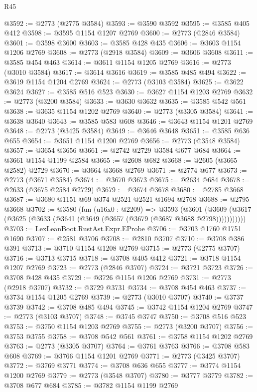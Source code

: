 \begin{lexlean}{R45}
\begin{coremodule}
@3592 := @2773 (@2775 @3584)
@3593 := @3590 @3592
@3595 := @3585 @405 @412
@3598 := @3595 @1154 @1207 @2769
@3600 := @2773 (@2846 @3584)
@3601 := @3598 @3600
@3603 := @3585 @428 @435
@3606 := @3603 @1154 @1206 @2769
@3608 := @2773 (@2918 @3584)
@3609 := @3606 @3608
@3611 := @3585 @454 @463
@3614 := @3611 @1154 @1205 @2769
@3616 := @2773 (@3010 @3584)
@3617 := @3614 @3616
@3619 := @3585 @485 @494
@3622 := @3619 @1154 @1204 @2769
@3624 := @2773 (@3103 @3584)
@3625 := @3622 @3624
@3627 := @3585 @516 @523
@3630 := @3627 @1154 @1203 @2769
@3632 := @2773 (@3200 @3584)
@3633 := @3630 @3632
@3635 := @3585 @542 @561
@3638 := @3635 @1154 @1202 @2769
@3640 := @2773 (@3305 @3584)
@3641 := @3638 @3640
@3643 := @3585 @583 @608
@3646 := @3643 @1154 @1201 @2769
@3648 := @2773 (@3425 @3584)
@3649 := @3646 @3648
@3651 := @3585 @636 @655
@3654 := @3651 @1154 @1200 @2769
@3656 := @2773 (@3548 @3584)
@3657 := @3654 @3656
@3661 := @2742 @2729 @3584 @677 @684
@3664 := @3661 @1154 @1199 @2584
@3665 := @2608 @682
@3668 := @2605 (@3665 @2582) @2729
@3670 := @3664 @3668 @2769
@3671 := @2774 @677
@3673 := @2773 (@3671 @3584)
@3674 := @3670 @3673
@3675 := @2634 @684
@3678 := @2633 (@3675 @2584 @2729)
@3679 := @3674 @3678
@3680 := @2785 @3668
@3687 := @3680 @1151 @69 @374 @2521 @2521 @1694 @2768
@3688 := @2795 @3668
@3702 := @3580
    (fun (u16x0 : @2209) =>
    @3593
      (@3601 (@3609 (@3617 (@3625 (@3633 (@3641 (@3649 (@3657 (@3679 (@3687 @3688 @2798)))))))))))
@3703 := LexLeanBoot.RustAst.Expr.EProbe
@3706 := @3703 @1760 @1751 @1690
@3707 := @2581 @3706
@3708 := @2810 @3707
@3710 := @3708 @386 @391
@3713 := @3710 @1154 @1208 @2769
@3715 := @2773 (@2775 @3707)
@3716 := @3713 @3715
@3718 := @3708 @405 @412
@3721 := @3718 @1154 @1207 @2769
@3723 := @2773 (@2846 @3707)
@3724 := @3721 @3723
@3726 := @3708 @428 @435
@3729 := @3726 @1154 @1206 @2769
@3731 := @2773 (@2918 @3707)
@3732 := @3729 @3731
@3734 := @3708 @454 @463
@3737 := @3734 @1154 @1205 @2769
@3739 := @2773 (@3010 @3707)
@3740 := @3737 @3739
@3742 := @3708 @485 @494
@3745 := @3742 @1154 @1204 @2769
@3747 := @2773 (@3103 @3707)
@3748 := @3745 @3747
@3750 := @3708 @516 @523
@3753 := @3750 @1154 @1203 @2769
@3755 := @2773 (@3200 @3707)
@3756 := @3753 @3755
@3758 := @3708 @542 @561
@3761 := @3758 @1154 @1202 @2769
@3763 := @2773 (@3305 @3707)
@3764 := @3761 @3763
@3766 := @3708 @583 @608
@3769 := @3766 @1154 @1201 @2769
@3771 := @2773 (@3425 @3707)
@3772 := @3769 @3771
@3774 := @3708 @636 @655
@3777 := @3774 @1154 @1200 @2769
@3779 := @2773 (@3548 @3707)
@3780 := @3777 @3779
@3782 := @3708 @677 @684
@3785 := @3782 @1154 @1199 @2769

\end{coremodule}
\end{lexlean}
